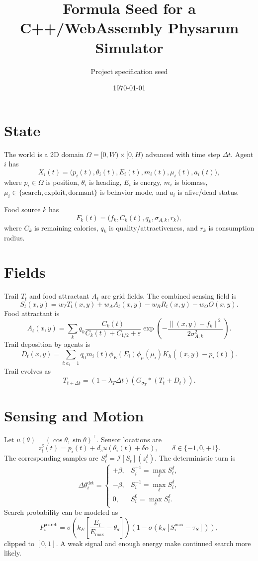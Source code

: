 \documentclass[11pt]{article}
\title{Formula Seed for a C++/WebAssembly Physarum Simulator}
\author{Project specification seed}
\date{\today}
\begin{document}
\maketitle

\section{State}
The world is a 2D domain $\Omega=[0,W)\times[0,H)$ advanced with time step
$\Delta t$. Agent $i$ has
\[
X_i(t)=\bigl(p_i(t),\theta_i(t),E_i(t),m_i(t),\mu_i(t),a_i(t)\bigr),
\]
where $p_i\in\Omega$ is position, $\theta_i$ is heading, $E_i$ is energy,
$m_i$ is biomass, $\mu_i\in\{\mathrm{search},\mathrm{exploit},
\mathrm{dormant}\}$ is behavior mode, and $a_i$ is alive/dead status.

Food source $k$ has
\[
F_k(t)=\bigl(f_k,C_k(t),q_k,\sigma_{A,k},r_k\bigr),
\]
where $C_k$ is remaining calories, $q_k$ is quality/attractiveness, and $r_k$
is consumption radius.

\section{Fields}
Trail $T_t$ and food attractant $A_t$ are grid fields. The combined sensing
field is
\[
S_t(x,y)=w_TT_t(x,y)+w_AA_t(x,y)-w_RR_t(x,y)-w_OO(x,y).
\]
Food attractant is
\[
A_t(x,y)=\sum_k q_k
\frac{C_k(t)}{C_k(t)+C_{1/2}+\varepsilon}
\exp\left(-\frac{\|(x,y)-f_k\|^2}{2\sigma_{A,k}^2}\right).
\]
Trail deposition by agents is
\[
D_t(x,y)=\sum_{i:a_i=1} q_0m_i(t)\phi_E(E_i)\phi_\mu(\mu_i)K_h((x,y)-p_i(t)).
\]
Trail evolves as
\[
T_{t+\Delta t}=(1-\lambda_T\Delta t)\left(G_{\sigma_T}*(T_t+D_t)\right).
\]

\section{Sensing and Motion}
Let $u(\theta)=(\cos\theta,\sin\theta)^\top$. Sensor locations are
\[
z_i^\delta(t)=p_i(t)+d_su(\theta_i(t)+\delta\alpha),
\qquad \delta\in\{-1,0,+1\}.
\]
The corresponding samples are $S_i^\delta=\mathcal I[S_t](z_i^\delta)$.
The deterministic turn is
\[
\Delta\theta_i^{\mathrm{det}}=
\begin{cases}
+\beta, & S_i^{+1}=\max_\delta S_i^\delta,\\
-\beta, & S_i^{-1}=\max_\delta S_i^\delta,\\
0, & S_i^{0}=\max_\delta S_i^\delta.
\end{cases}
\]
Search probability can be modeled as
\[
P_i^{\mathrm{search}}=
\sigma\!\left(k_E\left[\frac{E_i}{E_{\max}}-\theta_d\right]\right)
\left(1-\sigma\!\left(k_S[S_i^{\max}-\tau_S]\right)\right),
\]
clipped to $[0,1]$. A weak signal and enough energy make continued search more
likely.
\end{document}
